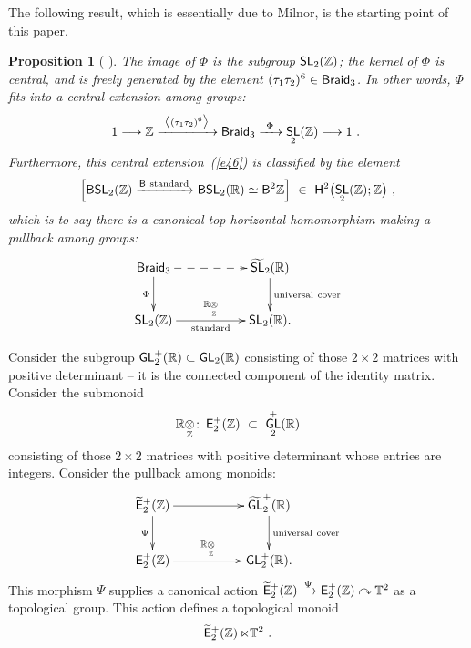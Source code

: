 \documentclass{amsart}
\newtheorem{prop}[theorem]{Proposition}
\theoremstyle{definition}
\theoremstyle{remark}
\newcommand{\lacts}{\curvearrowright}
\def\ot{\otimes}
\newcommand{\lag}{\langle}
\newcommand{\rag}{\rangle}
\newcommand{\w}{\widetilde}
\newcommand{\xra}{\xrightarrow}
\def\sE{\mathsf E}\def\sF{\mathsf F}\def\sG{\mathsf G}\def\sH{\mathsf H}
\DeclareMathOperator{\Braid}{{\sf Braid}_3}
\DeclareMathOperator{\Ebraid}{\w{\sf E}_{2}^{+}(\ZZ)}
\DeclareMathOperator{\GL}{\sf GL}
\DeclareMathOperator{\SL}{\sf SL}
\DeclareMathOperator{\EpZ}{\sE^+_2(\ZZ)}
\begin{document}
The following result, which is essentially due to Milnor, is the starting point of this paper.  
\begin{prop}
[{\color{red} \cite{milnor ... (find the citation ... should be in Rawnsley)}}]
\label{t32}
The image of $\Phi$ is the subgroup $\SL_2(\ZZ)$; the kernel of $\Phi$ is central, and is freely generated by the element $(\tau_{1}\tau_{2})^6  \in \Braid$.
In other words, $\Phi$ fits into a central extension among groups:
\begin{equation}
\label{e46}
1
\longrightarrow
\ZZ
\xra{~\bigl\lag (\tau_{1}\tau_{2})^6 \bigr\rag~}
\Braid
\xra{~\Phi~}
\SL_2(\ZZ)
\longrightarrow  
1
~.~
\end{equation}
%
%
%
%
Furthermore, this central extension~(\ref{e46}) is classified by the element
\[
\Bigl[{\sf BSL}_2(\ZZ) \xra{\sB~\rm standard} {\sf BSL}_2(\RR) \simeq \sB^2 \ZZ
\Bigr] 
~\in~ 
\sH^2\bigl( \SL_2(\ZZ) ; \ZZ \bigr)
~,
\]
which is to say there is a canonical top horizontal homomorphism making a pullback among groups:
\[
\xymatrix{
\Braid
\ar@{-->}[rr]
\ar[d]_-{\Phi}
&&
\w{\SL}_2(\RR)  \ar[d]^-{\rm universal~cover}
\\
\SL_2(\ZZ)
\ar[rr]_-{\rm standard}^-{\RR\underset{\ZZ}\ot}
&&
\SL_2(\RR)
.
}
\]



\end{prop}






Consider the subgroup $\GL^+_2(\RR)\subset \GL_2(\RR)$ consisting of those $2\times 2$ matrices with positive determinant -- it is the connected component of the identity matrix.  
Consider the submonoid
\[
\RR\underset{\ZZ}\ot
\colon
\EpZ
~\subset~
\GL^+_2(\RR)
\]
consisting of those $2\times 2$ matrices with positive determinant whose entries are integers.
Consider the pullback among monoids:
\begin{equation}
\label{e77}
\xymatrix{
\Ebraid
\ar[d]_-{\Psi} \ar[rr]
&&
\w{\GL}^+_2(\RR)  \ar[d]^-{\rm universal~cover}
\\
\EpZ
\ar[rr]^-{\RR \underset{\ZZ}\ot}
&&
\GL^+_2(\RR)
.
}
\end{equation}
This morphism $\Psi$ supplies a canonical action $\Ebraid \xra{\Psi} \EpZ \lacts \TT^2$ as a topological group.
This action defines a topological monoid
\[
\Ebraid \ltimes \TT^2 
~.
\]
\end{document}
